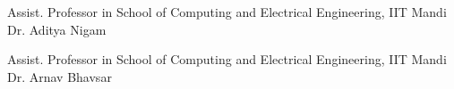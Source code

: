 


\begin{cventries}


\cventry
{Assist. Professor in School of Computing and Electrical Engineering, IIT Mandi} %
{Dr. Aditya Nigam} %
{} %
{} %
{ %
\begin{cvitems}
\end{cvitems}
}


\cventry
{Assist. Professor in School of Computing and Electrical Engineering, IIT Mandi} %
{Dr. Arnav Bhavsar} %
{} %
{} %
{ %
\begin{cvitems}
\end{cvitems}
}


\end{cventries}